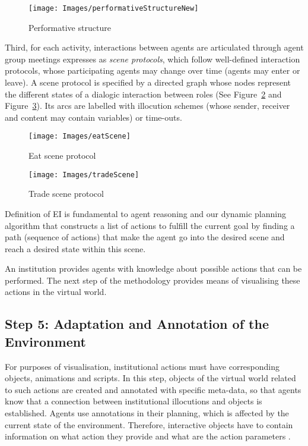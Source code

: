 \begin{figure}[!ht]       
    \texttt{[image: Images/performativeStructureNew]}
    \caption{Performative structure}
    \label{fig:ps}
\end{figure}


Third, for each activity, interactions between agents are articulated through agent group meetings expresses as \textit{scene protocols}, which follow well-defined interaction protocols, whose participating agents may change over time (agents may enter or leave). A scene protocol is specified by a directed graph whose nodes represent the different states of a dialogic interaction between roles (See Figure~\ref{fig:eatScene} and Figure~\ref{fig:tradeScene}). Its arcs are labelled with illocution schemes (whose sender, receiver and content may contain variables) or time-outs.



\begin{figure}[t]
\sidecaption[t]
\texttt{[image: Images/eatScene]}
\caption{Eat scene protocol}
\label{fig:eatScene}       
\end{figure}


\begin{figure}[t]
\sidecaption[t]
\texttt{[image: Images/tradeScene]}
\caption{Trade scene protocol}
\label{fig:tradeScene}      
\end{figure}

Definition of EI is fundamental to agent reasoning and our dynamic planning algorithm that constructs a list of actions to fulfill the current goal by finding a path (sequence of actions) that make the agent go into the desired scene and reach a desired state within this scene.

An institution provides agents with knowledge about possible actions that can be performed. The next step of the methodology provides means of visualising these actions in the virtual world.


\subsection{Step 5: Adaptation and Annotation of the Environment}

\label{sec:adaptation}
  
For purposes of visualisation, institutional actions must have corresponding objects, animations and scripts. In this step, objects of the virtual world related to such actions are created and annotated with specific meta-data, so that agents know that a connection between institutional illocutions and objects is established. Agents use annotations in their planning, which is affected by the current state of the environment. Therefore, interactive objects have to contain information on what action they provide and what are the action parameters \cite{trescak_thesis}.

